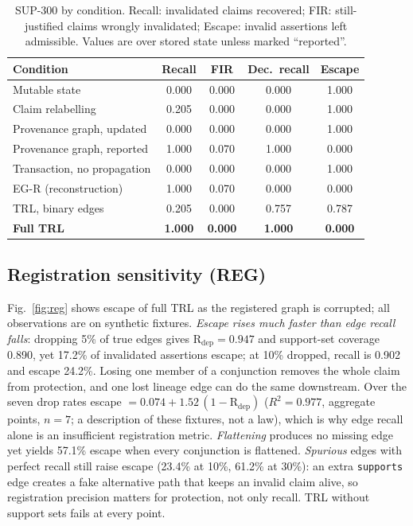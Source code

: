 \documentclass[journal]{IEEEtran}
\begin{document}
\begin{table}[t]
\centering
\caption{SUP-300 by condition. Recall: invalidated claims recovered; FIR: still-justified claims wrongly invalidated; Escape: invalid assertions left admissible. Values are over stored state unless marked ``reported''.}
\label{tab:sup}
\scriptsize
\begin{tabular}{@{}lcccc@{}}
\toprule
Condition & Recall & FIR & Dec.\ recall & Escape \\
\midrule
Mutable state & 0.000 & 0.000 & 0.000 & 1.000 \\
Claim relabelling & 0.205 & 0.000 & 0.000 & 1.000 \\
Provenance graph, updated & 0.000 & 0.000 & 0.000 & 1.000 \\
Provenance graph, reported & 1.000 & 0.070 & 1.000 & 0.000 \\
Transaction, no propagation & 0.000 & 0.000 & 0.000 & 1.000 \\
EG-R (reconstruction) & 1.000 & 0.070 & 0.000 & 0.000 \\
TRL, binary edges & 0.205 & 0.000 & 0.757 & 0.787 \\
\textbf{Full TRL} & \textbf{1.000} & \textbf{0.000} & \textbf{1.000} & \textbf{0.000} \\
\bottomrule
\end{tabular}
\end{table}

\subsection{Registration sensitivity (REG)}
\label{sec:reg_results}
Fig.~\ref{fig:reg} shows escape of full TRL as the registered graph is corrupted; all observations are on synthetic fixtures. \emph{Escape rises much faster than edge recall falls}: dropping 5\% of true edges gives $\mathrm{R}_{\mathrm{dep}}=0.947$ and support-set coverage 0.890, yet 17.2\% of invalidated assertions escape; at 10\% dropped, recall is 0.902 and escape 24.2\%. Losing one member of a conjunction removes the whole claim from protection, and one lost lineage edge can do the same downstream. Over the seven drop rates escape $=0.074+1.52\,(1-\mathrm{R}_{\mathrm{dep}})$ ($R^2=0.977$, aggregate points, $n=7$; a description of these fixtures, not a law), which is why edge recall alone is an insufficient registration metric. \emph{Flattening} produces no missing edge yet yields 57.1\% escape when every conjunction is flattened. \emph{Spurious} edges with perfect recall still raise escape (23.4\% at 10\%, 61.2\% at 30\%): an extra \texttt{supports} edge creates a fake alternative path that keeps an invalid claim alive, so registration precision matters for protection, not only recall. TRL without support sets fails at every point.
\end{document}
